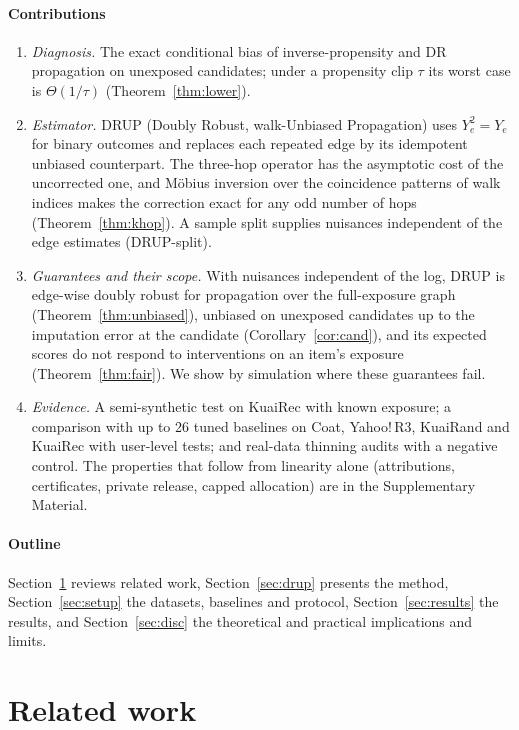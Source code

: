 \documentclass[preprint,review,12pt,authoryear]{elsarticle}
\theoremstyle{definition}
\begin{document}
\paragraph{Contributions}
\begin{enumerate}
\item \emph{Diagnosis.} The exact conditional bias of inverse-propensity and DR
propagation on unexposed candidates; under a propensity clip $\tau$ its worst
case is $\Theta(1/\tau)$ (Theorem~\ref{thm:lower}).
\item \emph{Estimator.} DRUP (Doubly Robust, walk-Unbiased Propagation) uses
$Y_e^2=Y_e$ for binary outcomes and replaces each repeated edge by its
idempotent unbiased counterpart. The three-hop operator has the asymptotic cost
of the uncorrected one, and Möbius inversion over the coincidence patterns of
walk indices makes the correction exact for any odd number of hops
(Theorem~\ref{thm:khop}). A sample split supplies nuisances independent of the
edge estimates (DRUP-split).
\item \emph{Guarantees and their scope.} With nuisances independent of the log,
DRUP is edge-wise doubly robust for propagation over the full-exposure graph
(Theorem~\ref{thm:unbiased}), unbiased on unexposed candidates up to the
imputation error at the candidate (Corollary~\ref{cor:cand}), and its expected
scores do not respond to interventions on an item's exposure
(Theorem~\ref{thm:fair}). We show by simulation where these guarantees fail.
\item \emph{Evidence.} A semi-synthetic test on KuaiRec with known exposure;
a comparison with up to 26 tuned baselines on Coat, Yahoo!\,R3, KuaiRand and
KuaiRec with user-level tests; and real-data thinning audits with a negative
control. The properties that follow from linearity alone (attributions,
certificates, private release, capped allocation) are in the Supplementary
Material.
\end{enumerate}

\paragraph{Outline} Section~\ref{sec:related} reviews related work,
Section~\ref{sec:drup} presents the method, Section~\ref{sec:setup} the datasets,
baselines and protocol, Section~\ref{sec:results} the results, and
Section~\ref{sec:disc} the theoretical and practical implications and limits.

\section{Related work}\label{sec:related}
\end{document}
